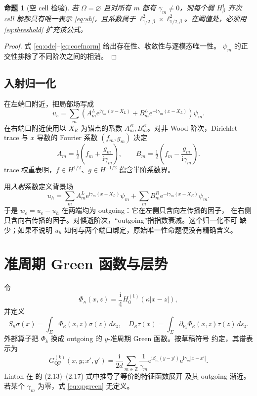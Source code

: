 \documentclass[UTF8,11pt,fontset=fandol]{ctexart}
\newcommand{\Om}{\Omega}
\newcommand{\Sig}{\Sigma}
\newcommand{\Z}{\mathbb Z}
\newcommand{\ii}{\mathrm i}
\newcommand{\ee}{\mathrm e}
\newcommand{\QP}{\mathrm{QP}}
\theoremstyle{plain}
\newtheorem{proposition}[theorem]{命题}
\theoremstyle{definition}
\theoremstyle{remark}
\begin{document}
\begin{proposition}[空 cell 检验]
\label{prop:empty}
若 \(\Om=\varnothing\) 且对所有 \(m\) 都有 \(\gamma_m\neq0\)，则每个弱
\(H^1_\beta\) 齐次 cell 解都具有唯一表示 \eqref{eq:uh}，且系数属于
\(\ell^2_{1/2,\beta}\times\ell^2_{1/2,\beta}\)。在阈值处，必须用
\eqref{eq:threshold} 扩充该公式。
\end{proposition}

\begin{proof}
式 \eqref{eq:ode}--\eqref{eq:coefnorm} 给出存在性、收敛性与逐模态唯一性。
\(\psi_m\) 的正交性排除了不同阶次之间的相消。
\end{proof}

\subsection{入射归一化}

在左端口附近，把局部场写成
\[
u_e=\sum_m(A_m^L\ee^{\ii\gamma_m(x-X_L)}
+B_m^L\ee^{-\ii\gamma_m(x-X_L)})\psi_m.
\]
在右端口附近使用以 \(X_R\) 为锚点的系数 \(A_m^R,B_m^R\)。对非 Wood
阶次，Dirichlet trace 与 \(x\) 导数的 Fourier 系数 \((f_m,g_m)\) 决定
\begin{equation}
A_m=\tfrac12\left(f_m+\frac{g_m}{\ii\gamma_m}\right),\qquad
B_m=\tfrac12\left(f_m-\frac{g_m}{\ii\gamma_m}\right).
\label{eq:portcoeff}
\end{equation}
trace 权重表明，\(f\in H^{1/2}\)、\(g\in H^{-1/2}\) 蕴含半阶系数界。

用\emph{入射}系数定义背景场
\begin{equation}
u_h=\sum_m A_m^L\ee^{\ii\gamma_m(x-X_L)}\psi_m
+\sum_m B_m^R\ee^{-\ii\gamma_m(x-X_R)}\psi_m.
\label{eq:incomingh}
\end{equation}
于是 \(w_e=u_e-u_h\) 在两端均为 outgoing：它在左侧只含向左传播的因子，
在右侧只含向右传播的因子。对倏逝阶次，“outgoing”指指数衰减。这个归一化不可
缺少；如果不说明 \(u_h\) 如何与两个端口绑定，原始唯一性命题便没有精确含义。

\section{准周期 Green 函数与层势}
\label{sec:layers}

令
\[
\Phi_\kappa(x,z)=\frac{\ii}{4}H_0^{(1)}(\kappa|x-z|),
\]
并定义
\begin{equation}
S_\kappa\sigma(x)=\int_\Sig\Phi_\kappa(x,z)\sigma(z)\,ds_z,
\quad
D_\kappa\tau(x)=\int_\Sig\partial_{\nu_z}\Phi_\kappa(x,z)\tau(z)\,ds_z.
\label{eq:potentials}
\end{equation}
外部算子把 \(\Phi_k\) 换成 outgoing 的 \(y\)-准周期 Green 函数。按草稿符号
约定，其谱表示为
\begin{equation}
G_{\QP}^{(k)}(x,y;x',y')
=\frac{\ii}{2d}\sum_{m\in\Z}\frac{1}{\gamma_m}
\ee^{\ii\beta_m(y-y')}\ee^{\ii\gamma_m|x-x'|}.
\label{eq:qpgreen}
\end{equation}
Linton 在 \cite{Linton1998} 的 (2.13)--(2.17) 式中推导了等价的特征函数展开
及其 outgoing 渐近。若某个 \(\gamma_m\) 为零，式 \eqref{eq:qpgreen} 无定义。
\end{document}

